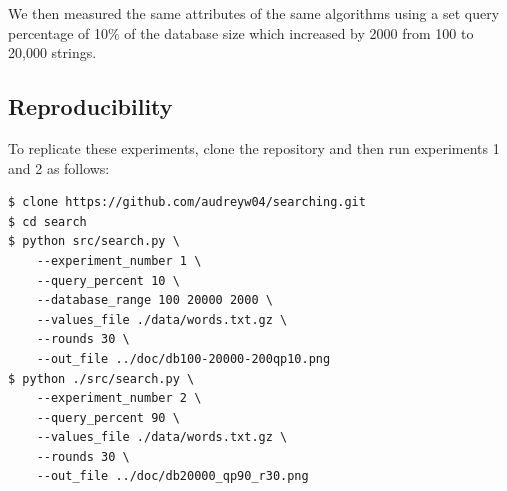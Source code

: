 \documentclass[11pt, letterpaper]{article}
\begin{document}
We then measured the same attributes of the same algorithms using a set query 
percentage of 10\% of the database size which increased by 2000 from 100 to 20,000 
strings.

\subsection{Reproducibility}

To replicate these experiments, clone the repository and then run experiments 1 and 2 as follows:
\begin{verbatim}
$ clone https://github.com/audreyw04/searching.git
$ cd search
$ python src/search.py \
    --experiment_number 1 \
    --query_percent 10 \
    --database_range 100 20000 2000 \
    --values_file ./data/words.txt.gz \
    --rounds 30 \
    --out_file ../doc/db100-20000-200qp10.png 
$ python ./src/search.py \
    --experiment_number 2 \
    --query_percent 90 \
    --values_file ./data/words.txt.gz \
    --rounds 30 \
    --out_file ../doc/db20000_qp90_r30.png
\end{verbatim}
\end{document}
